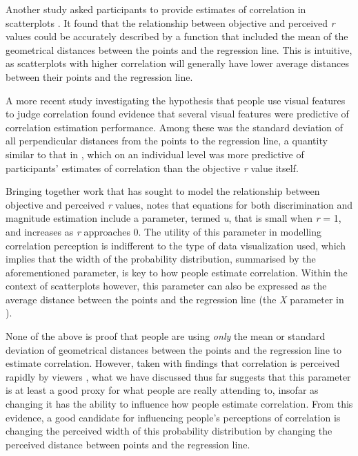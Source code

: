 \documentclass[preprint, 3p,
authoryear]{elsarticle} %
\begin{document}
Another study asked participants to provide estimates of correlation in
scatterplots \citep{meyer_1997}. It found that the relationship between
objective and perceived \emph{r} values could be accurately described by
a function that included the mean of the geometrical distances between
the points and the regression line. This is intuitive, as scatterplots
with higher correlation will generally have lower average distances
between their points and the regression line.

A more recent study investigating the hypothesis that people use visual
features to judge correlation \citep{yang_2019} found evidence that
several visual features were predictive of correlation estimation
performance. Among these was the standard deviation of all perpendicular
distances from the points to the regression line, a quantity similar to
that in \citet{meyer_1997}, which on an individual level was more
predictive of participants' estimates of correlation than the objective
\emph{r} value itself.

Bringing together work that has sought to model the relationship between
objective and perceived \emph{r} values, \citet{rensink_2017} notes that
equations for both discrimination and magnitude estimation include a
parameter, termed \emph{u}, that is small when \emph{r} = 1, and
increases as \emph{r} approaches 0. The utility of this parameter in
modelling correlation perception is indifferent to the type of data
visualization used, which implies that the width of the probability
distribution, summarised by the aforementioned parameter, is key to how
people estimate correlation. Within the context of scatterplots however,
this parameter can also be expressed as the average distance between the
points and the regression line (the \emph{X} parameter in
\citealp{meyer_1997}).

None of the above is proof that people are using \emph{only} the mean or
standard deviation of geometrical distances between the points and the
regression line to estimate correlation. However, taken with findings
that correlation is perceived rapidly by viewers \citep{rensink_2014},
what we have discussed thus far suggests that this parameter is at least
a good proxy for what people are really attending to, insofar as
changing it has the ability to influence how people estimate
correlation. From this evidence, a good candidate for influencing
people's perceptions of correlation is changing the perceived width of
this probability distribution by changing the perceived distance between
points and the regression line.
\end{document}
